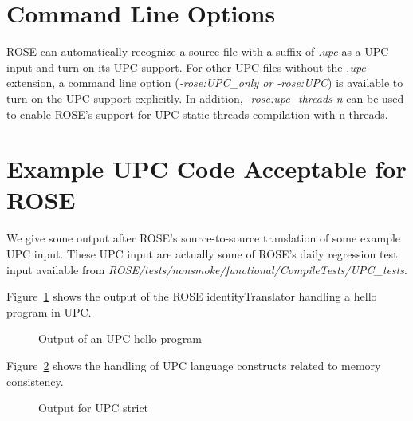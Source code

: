 \section{Command Line Options}
ROSE can automatically recognize a source file with a suffix of \textit{.upc} as a UPC input and turn on its UPC support.
For other UPC files without the \textit{.upc} extension, a command line
option (\textit{-rose:UPC\_only or -rose:UPC}) is available to turn on the
UPC support explicitly.
In addition, \textit{-rose:upc\_threads n} can be used to enable ROSE's
support for UPC static threads compilation with n threads.

\section{Example UPC Code Acceptable for ROSE}
We give some output after ROSE's source-to-source translation of some example UPC input. 
These UPC input are actually some of ROSE's daily regression test input available from \textit{ROSE/tests/nonsmoke/functional/CompileTests/UPC\_tests}.

Figure~\ref{Manual:UPC:hello} shows the output of the ROSE
identityTranslator handling a hello program in UPC.
\begin{figure}[!h]
{\indent
  {\mySmallFontSize
    \begin{latexonly}
    
    \end{latexonly}
    \begin{htmlonly}
    
    \end{htmlonly}
  }
}
\caption{Output of an UPC hello program}
\label{Manual:UPC:hello}
\end{figure}

Figure~\ref{Manual:UPC:strict} shows the handling of UPC language
constructs related to memory consistency. 
\begin{figure}[!h]
{\indent
  {\mySmallFontSize
    \begin{latexonly}
    
    \end{latexonly}
    \begin{htmlonly}
    
    \end{htmlonly}
  }
}
\caption{Output for UPC strict}
\label{Manual:UPC:strict}
\end{figure}


